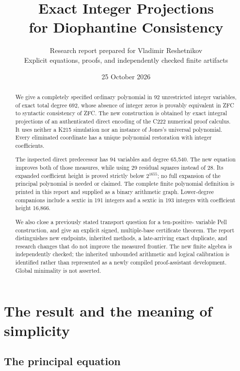 \documentclass[11pt]{article}
\title{Exact Integer Projections\\for Diophantine Consistency}
\author{Research report prepared for Vladimir Reshetnikov\\\small Explicit equations, proofs, and independently checked finite artifacts}
\date{25 October 2026}
\begin{document}
\maketitle
\begin{abstract}
We give a completely specified ordinary polynomial in 92 unrestricted
integer variables, of exact total degree 692, whose absence of integer
zeros is provably equivalent in ZFC to syntactic consistency of ZFC.
The new construction is obtained by exact integral projections of an
authenticated direct encoding of the C222 numerical proof calculus.
It uses neither a K215 simulation nor an instance of Jones's universal
polynomial. Every eliminated coordinate has a unique polynomial
restoration with integer coefficients.

The inspected direct predecessor has 94 variables and degree 65,540.
The new equation improves both of those measures, while using 29
residual squares instead of 28. Its expanded coefficient height is
proved strictly below $2^{1655}$; no full expansion of the principal
polynomial is needed or claimed. The complete finite polynomial
definition is printed in this report and supplied as a binary
arithmetic graph. Lower-degree companions include a sextic in 191
integers and a sextic in 193 integers with coefficient height 16,866.

We also close a previously stated transport question for a ten-positive-
variable Pell construction, and give an explicit signed, multiple-base
certificate theorem. The report distinguishes new endpoints, inherited
methods, a late-arriving exact duplicate, and research changes that do
not improve the measured frontier. The new finite algebra is independently
checked; the inherited unbounded arithmetic and logical calibration is
identified rather than represented as a newly compiled proof-assistant
development. Global minimality is not asserted.
\end{abstract}
\tableofcontents
\newpage

\section{The result and the meaning of simplicity}

\subsection{The principal equation}
\end{document}
